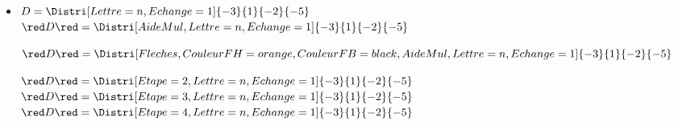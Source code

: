 \begin{corrige}
\begin{itemize}
        \bigskip
        \item $D=\Distri[Lettre=n,Echange=1]{-3}{1}{-2}{-5}$\\
        ${\red D}{\red = \Distri[AideMul,Lettre=n,Echange=1]{-3}{1}{-2}{-5}}$
        
        \bigskip        
        ${\red D}{\red =\Distri[Fleches,CouleurFH=orange,CouleurFB=black,AideMul,Lettre=n,Echange=1]{-3}{1}{-2}{-5}}$
        
        \bigskip
        ${\red D}{\red =\Distri[Etape=2,Lettre=n,Echange=1]{-3}{1}{-2}{-5}}$\\
        ${\red D}{\red =\Distri[Etape=3,Lettre=n,Echange=1]{-3}{1}{-2}{-5}}$\\
        ${\red D}{\red =\Distri[Etape=4,Lettre=n,Echange=1]{-3}{1}{-2}{-5}}$\\
    \end{itemize}
\end{corrige}

